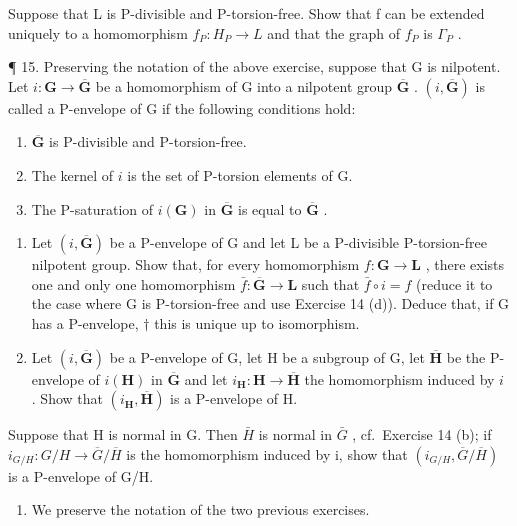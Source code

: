 Suppose that L is P-divisible and P-torsion-free. Show that f can be extended uniquely to a homomorphism \(f_{P}: H_{P} \to L\) and that the graph of \(f_{P}\) is \(\Gamma_{P}\) .

¶ 15. Preserving the notation of the above exercise, suppose that G is nilpotent. Let \(i: \mathbf{G} \to \overline{\mathbf{G}}\) be a homomorphism of G into a nilpotent group \(\overline{\mathbf{G}}\) . \((i, \overline{\mathbf{G}})\) is called a P-envelope of G if the following conditions hold:

\begin{enumerate}
\def\labelenumi{(\roman{enumi})}
\item
  \(\overline{\mathbf{G}}\) is P-divisible and P-torsion-free.
\item
  The kernel of \(i\) is the set of P-torsion elements of G.
\item
  The P-saturation of \(i(\mathbf{G})\) in \(\overline{\mathbf{G}}\) is equal to \(\overline{\mathbf{G}}\) .
\end{enumerate}

\begin{enumerate}
\def\labelenumi{(\alph{enumi})}
\item
  Let \((i, \overline{\mathbf{G}})\) be a P-envelope of G and let L be a P-divisible P-torsion-free nilpotent group. Show that, for every homomorphism \(f\colon \mathbf{G} \to \mathbf{L}\) , there exists one and only one homomorphism \(\bar{f}\colon \overline{\mathbf{G}} \to \mathbf{L}\) such that \(\bar{f} \circ i = f\) (reduce it to the case where G is P-torsion-free and use Exercise 14 (d)). Deduce that, if G has a P-envelope, \(\dagger\) this is unique up to isomorphism.
\item
  Let \((i, \overline{\mathbf{G}})\) be a P-envelope of G, let H be a subgroup of G, let \(\overline{\mathbf{H}}\) be the P-envelope of \(i(\mathbf{H})\) in \(\overline{\mathbf{G}}\) and let \(i_{\mathbf{H}}: \mathbf{H} \to \overline{\mathbf{H}}\) the homomorphism induced by \(i\) . Show that \((i_{\mathbf{H}}, \overline{\mathbf{H}})\) is a P-envelope of H.
\end{enumerate}

Suppose that H is normal in G. Then \(\bar{H}\) is normal in \(\bar{G}\) , cf.~Exercise 14 (b); if \(i_{G/H}: G/H \to \overline{G}/\overline{H}\) is the homomorphism induced by i, show that \((i_{G/H}, \overline{G}/\overline{H})\) is a P-envelope of G/H.

\begin{enumerate}
\def\labelenumi{\arabic{enumi}.}
\setcounter{enumi}{15}
\tightlist
\item
  We preserve the notation of the two previous exercises.
\end{enumerate}

